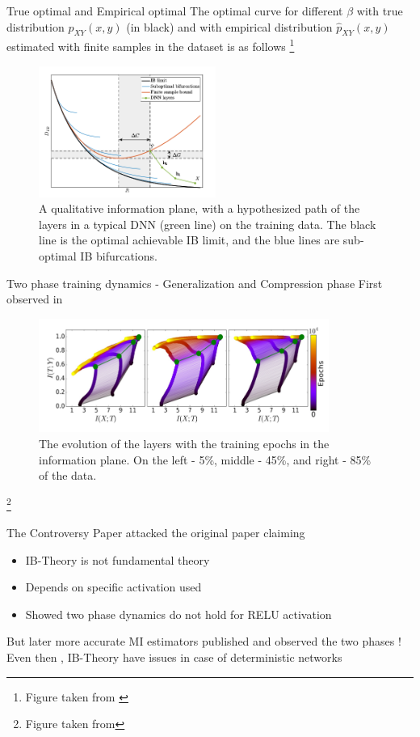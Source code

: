 \documentclass{beamer}
\begin{document}
\begin{frame}{True optimal and Empirical optimal}
The optimal curve for different $\beta$ with true distribution $p_{XY}(x, y)$ (in black) and with empirical distribution $\hat{p}_{XY}(x, y)$ estimated with finite samples in the dataset is as follows \footnote{Figure taken from \cite{IB}}
\begin{figure}[H]
\centering
\includegraphics[width=58mm]{Images/IB_curve.png}
\caption{A qualitative information plane, with a hypothesized path of the layers in a typical DNN (green line) on the training data. The black line is the optimal achievable IB limit, and the blue lines are sub-optimal IB bifurcations.}
\end{figure}
\end{frame}

\begin{frame}{Two phase training dynamics - Generalization and Compression phase}
First observed in \cite{BLACKBOXIB}
\begin{figure}[H]
\centering
\includegraphics[width=95mm]{Images/two_phase_dynamics.png}
\caption{The evolution of the layers with the training epochs in the information plane. On the left - 5\%, middle - 45\%, and right - 85\% of the data.}
\end{figure}
\footnote{Figure taken from }
\end{frame}

\begin{frame}{The Controversy}
Paper \cite{ATTACKING} attacked the original paper claiming 
\vspace{5mm}
\begin{itemize}
        \item IB-Theory is not fundamental theory
        \item Depends on specific activation used
        \item Showed two phase dynamics do not hold for RELU activation
    \end{itemize}
\vspace{5mm}
But later more accurate MI estimators published and observed the two phases ! \\
\vspace{5mm}
Even then , IB-Theory have issues in case of deterministic networks
\end{frame}
\end{document}
